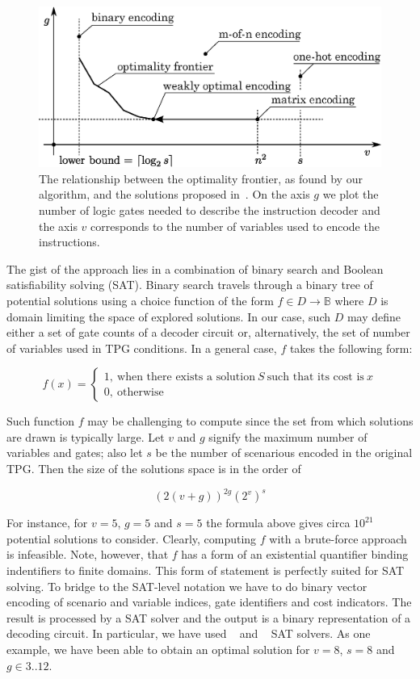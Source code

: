 \begin{figure}[t]
\centering
\includegraphics[scale=0.7]{fig/optimality_frontier}
\caption[The optimality frontier]{\label{fig:pareto}The relationship between the optimality frontier, as found by our algorithm, and the solutions proposed in~\cite{2009_mokhov_phd}. On the axis $g$ we plot the number of logic gates needed to describe the instruction decoder and the axis $v$ corresponds to the number of variables used to encode the instructions.}
\end{figure} 
 
The gist of the approach lies in a combination of binary search and Boolean satisfiability solving (SAT). Binary search travels through a binary tree of potential solutions using a choice function of the form $f \in D \rightarrow \mathbb{B}$ where $D$ is domain limiting the space of explored solutions. In our case, such $D$ may define either a set of gate counts of a decoder circuit or, alternatively, the set of number of variables used in TPG conditions. In a general case, $f$ takes the following form: 

$$f(x) = \left \{ \begin{array}{l} 1,~ \text{when there exists a solution} ~ S ~ \text{such that its cost is}~ x \\ 0,~ \text{otherwise}  \end{array} \right .$$   

\noindent
Such function $f$ may be challenging to compute since the set from which solutions are drawn is typically large. Let $v$ and $g$ signify the maximum number of variables and gates; also let $s$ be the number of scenarious encoded in the original TPG. Then the size of the solutions space is in the order of 

$$\left (2 (v + g) \right )^{2g} \left (2^{v} \right )^{s}$$  

\noindent For instance, for $v=5$, $g=5$ and $s=5$ the formula above gives circa $10^{21}$ potential solutions to consider. Clearly, computing $f$ with a brute-force approach is infeasible. Note, however, that $f$ has a form of an existential quantifier binding indentifiers to finite domains. This form of statement is perfectly suited for SAT solving. To bridge to the SAT-level notation we have to do binary vector encoding of scenario and variable indices, gate identifiers and cost indicators. The result is processed by a SAT solver and the output is a binary representation of a decoding circuit. In particular, we have used ~\cite{2004_miniSAT_lncs} and ~\cite{clasp} SAT solvers. As one example, we have been able to obtain an optimal solution for $v=8$, $s=8$ and $g \in 3 .. 12$.     
